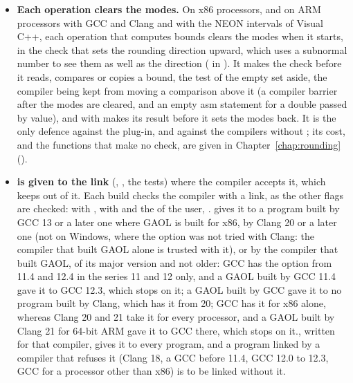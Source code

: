\begin{itemize}
\item[$\bullet$] \textbf{Each operation clears the modes.} On x86 processors,
  and on ARM processors with GCC and Clang and with the NEON intervals of
  Visual C++, each operation that computes bounds clears the modes when it
  starts, in the check that sets the rounding direction upward, which uses a
  subnormal number to see them as well as the direction
  ( in ). It makes
  the check before it reads, compares or copies a bound, the test of the
  empty set aside, the compiler being kept from moving a comparison above it
  (a compiler barrier after the modes are cleared, and an empty asm statement
  for a double passed by value), and with 
  makes its result before it sets the modes back. It is the only defence
  against the plug-in, and against the compilers without
  ; its cost, and the functions that make no check, are
  given in Chapter~\ref{chap:rounding} ().
\item[$\bullet$] \textbf{ is given to the link}
  (, , the tests) where the compiler accepts
  it, which keeps  out of it. Each build checks the
  compiler with a link, as the other flags are checked:
   with
  ,  with
   and the  of the user,
  .  gives it to a program built
  by GCC 13 or a later one where GAOL is built for x86, by Clang 20 or a later
  one (not on Windows, where the option was not tried with Clang: the compiler
  that built GAOL alone is trusted with it), or by the compiler that built
  GAOL, of its major version and not older: GCC has the option from 11.4 and
  12.4 in the series 11 and 12 only, and a GAOL built by GCC 11.4 gave it to
  GCC 12.3, which stops on it; a GAOL built by GCC gave it to no program built
  by Clang, which has it from 20; GCC has it for x86 alone, whereas Clang 20
  and 21 take it for every processor, and a GAOL built by Clang 21 for 64-bit
  ARM gave it to GCC there, which stops on it.\newinvfive {},
  written for that compiler, gives it to every program, and a program linked
  by a compiler that refuses it (Clang 18, a GCC before 11.4, GCC 12.0 to
  12.3, GCC for a processor other than x86) is to be linked without it.
\end{itemize}

